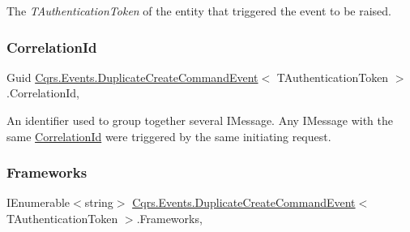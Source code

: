 The {\itshape T\+Authentication\+Token}  of the entity that triggered the event to be raised. 

\mbox{\label{classCqrs_1_1Events_1_1DuplicateCreateCommandEvent_a7a47624fa44952499c87458257184079_a7a47624fa44952499c87458257184079}} 
\subsubsection{\texorpdfstring{Correlation\+Id}{CorrelationId}}
{\footnotesize\ttfamily Guid \hyperlink{classCqrs_1_1Events_1_1DuplicateCreateCommandEvent}{Cqrs.\+Events.\+Duplicate\+Create\+Command\+Event}$<$ T\+Authentication\+Token $>$.Correlation\+Id\hspace{0.3cm}{\ttfamily [get]}, {\ttfamily [set]}}



An identifier used to group together several I\+Message. Any I\+Message with the same \hyperlink{classCqrs_1_1Events_1_1DuplicateCreateCommandEvent_a7a47624fa44952499c87458257184079_a7a47624fa44952499c87458257184079}{Correlation\+Id} were triggered by the same initiating request. 

\mbox{\label{classCqrs_1_1Events_1_1DuplicateCreateCommandEvent_a9cef5da3d0b1481cd3ec9fd448d501af_a9cef5da3d0b1481cd3ec9fd448d501af}} 
\subsubsection{\texorpdfstring{Frameworks}{Frameworks}}
{\footnotesize\ttfamily I\+Enumerable$<$string$>$ \hyperlink{classCqrs_1_1Events_1_1DuplicateCreateCommandEvent}{Cqrs.\+Events.\+Duplicate\+Create\+Command\+Event}$<$ T\+Authentication\+Token $>$.Frameworks\hspace{0.3cm}{\ttfamily [get]}, {\ttfamily [set]}}



